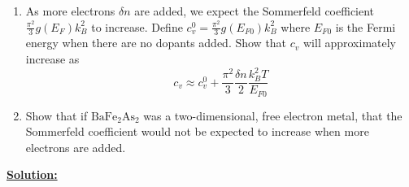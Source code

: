 \documentclass[11pt]{article}
\begin{document}
\begin{bluebox}
\begin{enumerate}
    \item As more electrons $\delta n$ are added, we expect the Sommerfeld coefficient $\frac{\pi^2}{3} g(E_F) k_B^2$ to increase. Define $c_v^0 = \frac{\pi^2}{3} g(E_{F0}) k_B^2$ where $E_{F0}$ is the Fermi energy when there are no dopants added. Show that $c_v$ will approximately increase as $$ c_v \approx c_v^0 + \frac{\pi^2}{3} \frac{\delta n}{2} \frac{k_B^2 T}{E_{F0}}  $$
    \item Show that if $\mathrm{BaFe}_2 \mathrm{As}_2$ was a two-dimensional, free electron metal, that the Sommerfeld coefficient would not be expected to increase when more electrons are added.  
  \end{enumerate}
\end{bluebox}

\vskip 0.5cm
\textbf{\underline{Solution:}}
\end{document}
